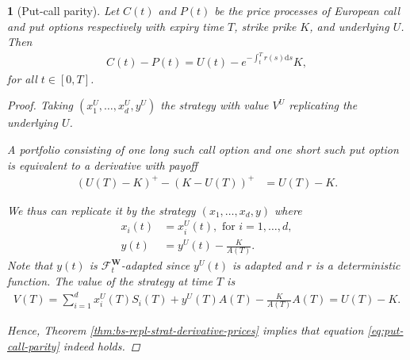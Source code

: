 \documentclass[english]{article}
\numberwithin{equation}{section}
\numberwithin{figure}{section}
\theoremstyle{bolddescit}
\newtheorem{theorem}{\protect\theoremname}[section]
\theoremstyle{definition}
\theoremstyle{definition}
\theoremstyle{plain}
\theoremstyle{plain}
\theoremstyle{bolddesc}
\theoremstyle{plain}
\theoremstyle{remark}
\providecommand{\theoremname}{Theorem}
\begin{document}
\begin{theorem}[Put-call parity]
  Let $C(t)$ and $P(t)$ be the price processes of European call and put options respectively with expiry time $T$, strike prike $K$, and underlying $U$. Then
  \begin{align}\label{eq:put-call-parity}
    C(t) - P(t) = U(t) - e^{-\int_t^T r(s) \mathrm{d}s} K,
  \end{align}
  for all $t \in [0,T]$.

  \begin{proof}
    Taking $(x_1^U,\ldots,x_d^U,y^U)$ the strategy with value $V^U$ replicating the underlying $U$.

    A portfolio consisting of one long such call option and one short such put option is equivalent to a derivative with payoff
    \begin{align*}
      (U(T) - K)^+ - (K - U(T))^+
      &= U(T) - K.
    \end{align*}

    We thus can replicate it by the strategy $(x_1,\ldots,x_d,y)$ where
    \begin{align*}
      x_i(t) &= x_i^U(t), \text{ for } i=1,\ldots,d,\\
      y(t) &= y^U(t) - \frac{K}{A(T)}.
    \end{align*}
    Note that $y(t)$ is $\mathcal{F}^\mathbf{W}_t$-adapted since $y^U(t)$ is adapted and $r$ is a deterministic function. The value of the strategy at time $T$ is
    \begin{align*}
      V(T) = \sum_{i=1}^d x_i^U(T) S_i(T) + y^U(T) A(T) - \frac{K}{A(T)} A(T)
      = U(T) - K.
    \end{align*}

    Hence, Theorem \ref{thm:bs-repl-strat-derivative-prices} implies that equation \eqref{eq:put-call-parity} indeed holds.
  \end{proof}
\end{theorem}
\end{document}
